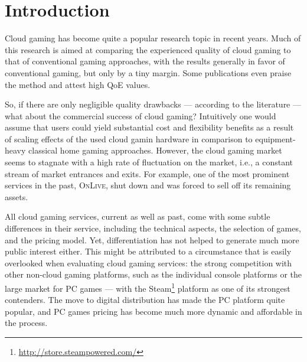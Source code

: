 

\section{Introduction}

Cloud gaming has become quite a popular research topic in recent years. 
Much of this research is aimed at comparing the experienced 
quality of cloud gaming to that of conventional gaming approaches, with 
the results
generally in favor of conventional gaming, but only by a 
tiny margin. Some publications even praise the method and attest high 
\gls{QoE} values.

So, if there are only negligible quality drawbacks --- according to the 
literature --- what about the commercial success of cloud gaming? Intuitively one would assume that users could yield substantial cost and flexibility benefits as a result of scaling effects of the used cloud gamin hardware in comparison to equipment-heavy classical home gaming approaches. However, the cloud gaming market seems to stagnate with a high rate of fluctuation on the market, i.e., a constant stream of market entrances and exits. For example, one of the most prominent services in the past, \textsc{OnLive}, shut down and was forced to 
sell off its remaining assets.



All cloud gaming services, current as well 
as past, come with some subtle differences in their service, including 
the technical aspects, the selection of games, and the pricing 
model.
Yet, differentiation has not helped to generate much more public 
interest either. 
This might be attributed to a circumstance that is easily  
overlooked when evaluating cloud gaming services: the strong 
competition with other non-cloud gaming platforms, such as the 
individual console platforms or the large market for PC games --- with the 
Steam\footnote{\url{http://store.steampowered.com/}} platform as one of 
its strongest contenders. The move to digital distribution has made the 
PC platform quite popular, and PC games pricing has become 
much more dynamic and affordable in the process.

